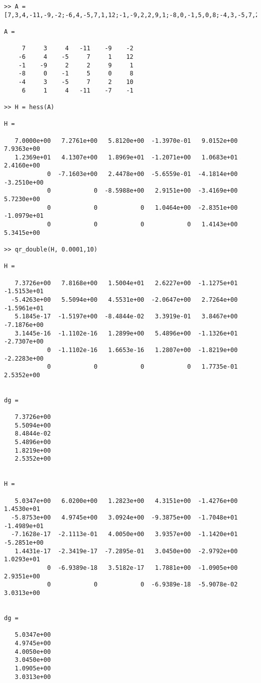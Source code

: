 \begin{verbatim}
>> A = [7,3,4,-11,-9,-2;-6,4,-5,7,1,12;-1,-9,2,2,9,1;-8,0,-1,5,0,8;-4,3,-5,7,2,10;6,1,4,-11,-7,-1]

A =

     7     3     4   -11    -9    -2
    -6     4    -5     7     1    12
    -1    -9     2     2     9     1
    -8     0    -1     5     0     8
    -4     3    -5     7     2    10
     6     1     4   -11    -7    -1

>> H = hess(A)

H =

   7.0000e+00   7.2761e+00   5.8120e+00  -1.3970e-01   9.0152e+00   7.9363e+00
   1.2369e+01   4.1307e+00   1.8969e+01  -1.2071e+00   1.0683e+01   2.4160e+00
            0  -7.1603e+00   2.4478e+00  -5.6559e-01  -4.1814e+00  -3.2510e+00
            0            0  -8.5988e+00   2.9151e+00  -3.4169e+00   5.7230e+00
            0            0            0   1.0464e+00  -2.8351e+00  -1.0979e+01
            0            0            0            0   1.4143e+00   5.3415e+00

>> qr_double(H, 0.0001,10)

H =

   7.3726e+00   7.8168e+00   1.5004e+01   2.6227e+00  -1.1275e+01  -1.5153e+01
  -5.4263e+00   5.5094e+00   4.5531e+00  -2.0647e+00   2.7264e+00  -1.5961e+01
   5.1845e-17  -1.5197e+00  -8.4844e-02   3.3919e-01   3.8467e+00  -7.1876e+00
   3.1445e-16  -1.1102e-16   1.2899e+00   5.4896e+00  -1.1326e+01  -2.7307e+00
            0  -1.1102e-16   1.6653e-16   1.2807e+00  -1.8219e+00  -2.2283e+00
            0            0            0            0   1.7735e-01   2.5352e+00


dg =

   7.3726e+00
   5.5094e+00
   8.4844e-02
   5.4896e+00
   1.8219e+00
   2.5352e+00


H =

   5.0347e+00   6.0200e+00   1.2823e+00   4.3151e+00  -1.4276e+00   1.4530e+01
  -5.8753e+00   4.9745e+00   3.0924e+00  -9.3875e+00  -1.7048e+01  -1.4989e+01
  -7.1628e-17  -2.1113e-01   4.0050e+00   3.9357e+00  -1.1420e+01  -5.2851e+00
   1.4431e-17  -2.3419e-17  -7.2895e-01   3.0450e+00  -2.9792e+00   1.0293e+01
            0  -6.9389e-18   3.5182e-17   1.7881e+00  -1.0905e+00   2.9351e+00
            0            0            0  -6.9389e-18  -5.9078e-02   3.0313e+00


dg =

   5.0347e+00
   4.9745e+00
   4.0050e+00
   3.0450e+00
   1.0905e+00
   3.0313e+00



\end{verbatim}
